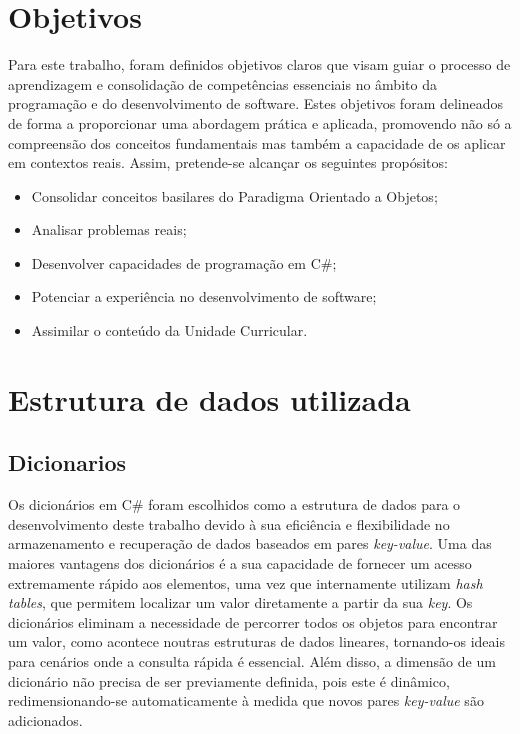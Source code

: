 \documentclass[11pt]{scrartcl} %
\begin{document}
\section{Objetivos}
Para este trabalho, foram definidos objetivos claros que visam guiar o processo de aprendizagem e consolidação de competências essenciais no âmbito da programação e do desenvolvimento de software. Estes objetivos foram delineados de forma a proporcionar uma abordagem prática e aplicada, promovendo não só a compreensão dos conceitos fundamentais mas também a capacidade de os aplicar em contextos reais. Assim, pretende-se alcançar os seguintes propósitos:
\begin{itemize}
	\item Consolidar conceitos basilares do Paradigma Orientado a Objetos; 
	\item Analisar problemas reais;
	\item Desenvolver capacidades de programação em C\#;
	\item Potenciar a experiência no desenvolvimento de software;
	\item Assimilar o conteúdo da Unidade Curricular.
\end{itemize}

\section{Estrutura de dados utilizada}
\subsection{Dicionarios}

Os dicionários em C\# foram escolhidos como a estrutura de dados para o desenvolvimento deste trabalho devido à sua eficiência e flexibilidade no armazenamento e recuperação de dados baseados em pares \textit{key-value}. Uma das maiores vantagens dos dicionários é a sua capacidade de fornecer um acesso extremamente rápido aos elementos, uma vez que internamente utilizam \textit{hash tables}, que permitem localizar um valor diretamente a partir da sua \textit{key}. Os dicionários eliminam a necessidade de percorrer todos os objetos para encontrar um valor, como acontece noutras estruturas de dados lineares, tornando-os ideais para cenários onde a consulta rápida é essencial. Além disso, a dimensão de um dicionário não precisa de ser previamente definida, pois este é dinâmico, redimensionando-se automaticamente à medida que novos pares \textit{key-value} são adicionados.
\end{document}
